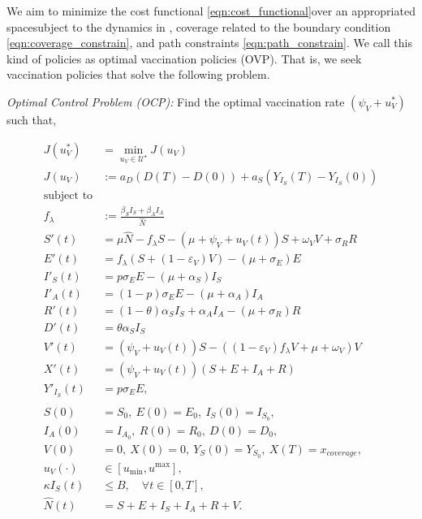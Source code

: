    We aim to minimize the cost functional
\eqref{eqn:cost_functional}\textemdash over an appropriated
space\textemdash subject to the dynamics in ,
coverage related to the boundary condition \eqref{eqn:coverage_constrain}, 
and path constraints \eqref{eqn:path_constrain}. We call this kind of 
policies as optimal vaccination policies (OVP). That is, we seek 
vaccination policies that solve the following problem.

\emph{Optimal Control Problem (OCP):}
    Find the optimal vaccination rate $(\psi_V + u_V^{*})$ such that, 
    
\begin{equation}
    \label{eqn:optimal_control_problem}
    \begin{aligned}
        J(u_V^*) &=
            \min_{u_V  \in \mathcal{U}^{\star}}
        J(u_V) 
        \\
        J(u_V) &:=
        a_D ( D(T) - D(0)) +
        a_S (Y_{I_S}(T) - Y_{I_S}(0))
        \\
        \text{subject to} &
        \\
        f_{\lambda}
        & :=
        \frac{\beta_S I_S + \beta_AI_A}{\widehat{N}}
        \\
        S'(t)
        &=
        \mu \widehat{N}-f_{\lambda} S -( \mu + \psi_V +  u_V(t)) S+ \omega_V V + \sigma_{R} R
        \\
        E'(t)
        &=
        f_{\lambda} (S + (1-\varepsilon_V) V)
        - (\mu+\sigma_E) E
        \\
        I'_S(t)
        &=p
        \sigma_E
        E-(\mu + \alpha_S) I_S
        \\
        I'_A(t)
        &= (1 - p) \sigma_E E-(\mu + \alpha_A) I_A
        \\
        R'(t)
        &= (1 - \theta) \alpha_S I_S + \alpha_A I_A
        - (\mu + \sigma_{R}) R
        \\
        D'(t)&=
        \theta \alpha_S I_S
        \\
        V'(t)&=
        (\psi_V + u_V(t)) S -
        \left(
        (1 -\varepsilon_V) f_{\lambda} V +
        \mu + \omega_V
        \right) V
        \\
        X'(t)&=
        (\psi_V + u_V(t))(S + E + I_A + R)
        \\
        Y'_{I_S}(t) &=p
        \sigma_E E,
        \\
        \\
        S(0) &= S_0, \ E(0) = E_0, \ I_S(0) = I_{S_{0}},
        \\
        I_A(0) &= I_{A_{0}}, \ R(0) = R_0, \ D(0) = D_0,
        \\
        V(0) &= 0, \ X(0) = 0, \ Y_S(0) = Y_{S_0}, 
        \ X(T) = x_{coverage},
        \\
        u_V(\cdot) & \in [u_{\min}, u^{\max}],
        \\
        \kappa I_S(t) & \leq B, \quad \forall t \in [0, T],
        \\
        \widehat{N}(t) &= S + E + I_S + I_A + R + V.
    \end{aligned}
\end{equation}
